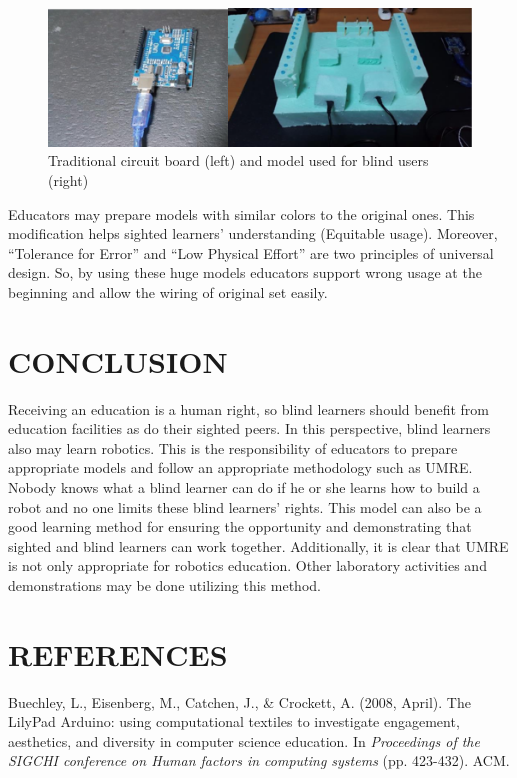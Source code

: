 \documentclass[11.5pt]{sig-alternate} %
\begin{document}
\begin{large}
\begin{figure}[!ht]
    \centering
    \includegraphics[width=1\linewidth]{fig4.png}
    \caption{Traditional circuit board (left) and model used for blind users (right) }
\end{figure}
\newpage

Educators may prepare models with similar colors to the original ones. This modification helps sighted learners’ understanding (Equitable usage).  Moreover, “Tolerance for Error” and “Low Physical Effort” are two principles of universal design.  So, by using these huge models educators support wrong usage at the beginning and allow the wiring of original set easily. 

\section*{CONCLUSION}

Receiving an education is a human right, so blind learners should benefit from education facilities as do their sighted peers.  In this perspective, blind learners also may learn robotics.  This is the responsibility of educators to prepare appropriate models and follow an appropriate methodology such as UMRE.  Nobody knows what a blind learner can do if he or she learns how to build a robot and no one limits these blind learners’ rights. This model can also be a good learning method for ensuring the opportunity and demonstrating that sighted and blind learners can work together.  Additionally, it is clear that UMRE is not only appropriate for robotics education.  Other laboratory activities and demonstrations may be done utilizing this method. 


\end{large}
\clearpage
\section*{REFERENCES}\par 

\leftskip 0.25in
\parindent -0.25in 
Buechley, L., Eisenberg, M., Catchen, J., \& Crockett, A. (2008, April). The LilyPad Arduino: using computational textiles to investigate engagement, aesthetics, and diversity in computer science education. In \textit{Proceedings of the SIGCHI conference on Human factors in computing systems} (pp. 423-432). ACM.
\end{document}
